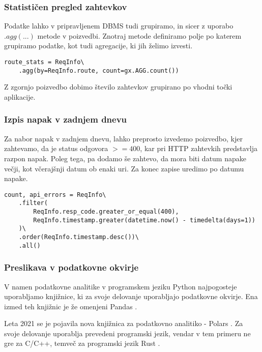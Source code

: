 \documentclass[a4paper,12pt,openright]{book}
\begin{document}
    \newpage
    \subsubsection{Statističen pregled zahtevkov}

    Podatke lahko v pripravljenem DBMS tudi grupiramo, in sicer z uporabo $.agg(...)$ metode v poizvedbi. Znotraj metode definiramo polje po katerem grupiramo podatke, kot tudi agregacije, ki jih želimo izvesti.
    
\begin{verbatim}
route_stats = ReqInfo\
    .agg(by=ReqInfo.route, count=gx.AGG.count())
\end{verbatim}

    \noindent
    Z zgornjo poizvedbo dobimo število zahtevkov grupirano po vhodni točki aplikacije. 

    \subsubsection{Izpis napak v zadnjem dnevu}

    Za nabor napak v zadnjem dnevu, lahko preprosto izvedemo poizvedbo, kjer zahtevamo, da je status odgovora $>= 400$, kar pri HTTP zahtevkih predstavlja razpon napak. Poleg tega, pa dodamo še zahtevo, da mora biti datum napake večji, kot včerajšnji datum ob enaki uri. Za konec zapise uredimo po datumu napake.
    
\begin{verbatim}
count, api_errors = ReqInfo\
    .filter(
        ReqInfo.resp_code.greater_or_equal(400),
        ReqInfo.timestamp.greater(datetime.now() - timedelta(days=1))
    )\
    .order(ReqInfo.timestamp.desc())\
    .all()
\end{verbatim}

    \subsubsection{Preslikava v podatkovne okvirje}

    V namen podatkovne analitike v programskem jeziku Python najpogosteje uporabljamo knjižnice, ki za svoje delovanje uporabljajo podatkovne okvirje. Ena izmed teh knjižnic je že omenjeni Pandas \cite{PANDAS_GITHUB}.
    
    Leta 2021 se je pojavila nova knjižnica za podatkovno analitiko - Polars \cite{POLARS}. Za svoje delovanje uporablja prevedeni programski jezik, vendar v tem primeru ne gre za C/C++, temveč za programski jezik Rust \cite{RUST}.
\end{document}
